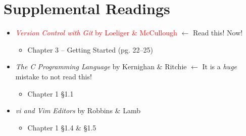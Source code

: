 \section{Supplemental Readings}


\begin{itemize}
  \item \textcolor{red}{\textit{Version Control with Git} by Loeliger \&
    McCullough} $\leftarrow$ Read this! Now!
    \begin{itemize}
      \item Chapter 3 -- Getting Started (pg. 22--25)
    \end{itemize}
  \item \textit{The C Programming Language} by Kernighan \& Ritchie $\leftarrow$
    It is a \emph{huge} mistake to not read this!
    \begin{itemize}
      \item Chapter 1 \S 1.1
    \end{itemize}
	\item \textit{vi and Vim Editors} by Robbins \& Lamb
    \begin{itemize}
      \item Chapter 1 \S 1.4 \& \S 1.5
    \end{itemize}
\end{itemize}
